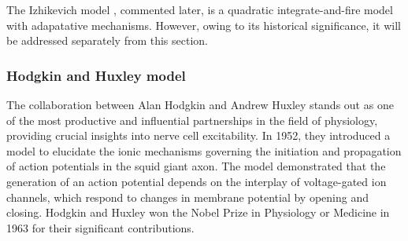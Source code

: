 \documentclass[../main.tex]{subfiles}
\begin{document}
The Izhikevich model \citep{izhikevich_simple_2003,izhikevich_dynamical_2007}, commented later, is a quadratic integrate-and-fire model with adapatative mechanisms.
However, owing to its historical significance, it will be addressed separately from this section.

\subsubsection{Hodgkin and Huxley model}
The collaboration between Alan Hodgkin and Andrew Huxley stands out as one of the most productive and influential partnerships in the field of physiology, providing crucial insights into nerve cell excitability.
In 1952, they introduced a model \citep{hodgkin_quantitative_1952} to elucidate the ionic mechanisms governing the initiation and propagation of action potentials in the squid giant axon.
The model demonstrated that the generation of an action potential depends on the interplay of voltage-gated ion channels, which respond to changes in membrane potential by opening and closing.
Hodgkin and Huxley won the Nobel Prize in Physiology or Medicine in 1963 \citep{schwiening_brief_2012} for their significant contributions.
\end{document}
